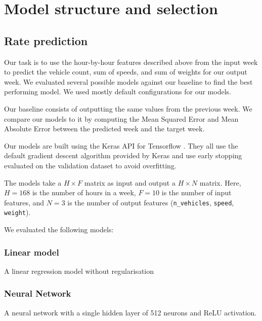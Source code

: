 \documentclass[10pt,conference,compsocconf]{IEEEtran}
\begin{document}

\section{Model structure and selection}

\subsection{Rate prediction}

Our task is to use the hour-by-hour features described above from the input week to predict the
vehicle count, sum of speeds, and sum of weights for our output week. We evaluated several
possible models against our baseline to find the best performing model. We used mostly default 
configurations for our models. 

Our baseline consists of outputting the same values from the previous week. We compare 
our models to it by computing the Mean Squared Error and Mean Absolute Error between the 
predicted week and the target week. 

Our models are built using the Keras \cite{keras} API for Tensorflow \cite{tensorflow}. They 
all use the default gradient descent algorithm provided by Keras and use early stopping evaluated 
on the validation dataset to avoid overfitting.

The models take a $H \times F$ matrix as input and output a $H \times N$ matrix. Here, $H = 168$ 
is the number of hours in a week, $F = 10$ is the number of input features, and $N = 3$ is the
number of output features (\texttt{n\_vehicles}, \texttt{speed}, \texttt{weight}).

We evaluated the following models:

\subsubsection{Linear model}

A linear regression model without regularisation 

\subsubsection{Neural Network}

A neural network with a single hidden layer of 512 neurons and ReLU activation.
\end{document}
